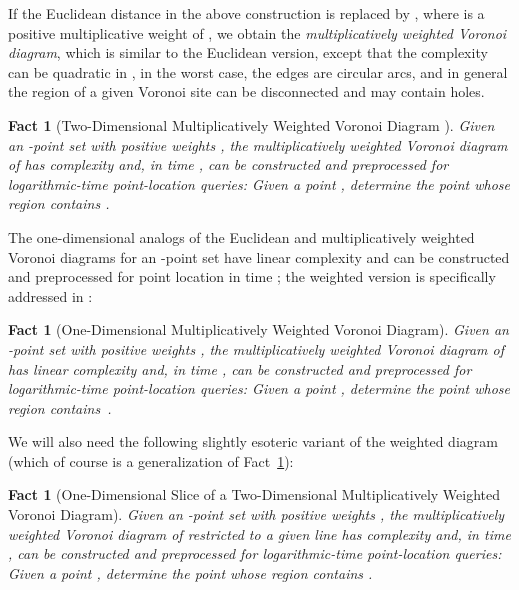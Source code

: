 \documentclass[11pt]{article}
\newtheorem{fact}[theorem]{Fact}
\theoremstyle{remark}
\begin{document}
If the Euclidean distance  in the above construction is replaced
by , where  is a positive multiplicative
weight of , we obtain the \emph{multiplicatively weighted Voronoi diagram},
which is similar to the Euclidean version, except that the complexity
can be quadratic in , in the worst case, the edges are circular
arcs, and in general the region of a given Voronoi site can be
disconnected and may contain holes.



\begin{fact}[Two-Dimensional Multiplicatively Weighted Voronoi Diagram \cite{ae-oacwvdp-84}]
  \label{fact:vor-2d-wtd}
  Given an -point set  with positive weights
  , the multiplicatively weighted Voronoi diagram of  has
  complexity  and, in time ,  can be constructed and
  preprocessed for logarithmic-time \emph{point-location queries}:
  Given a point , determine the point  whose region 
  contains .
\end{fact}

The one-dimensional analogs of the Euclidean and multiplicatively
weighted Voronoi diagrams for an -point set have linear complexity
and can be constructed and preprocessed for point location in time
; the weighted version is specifically addressed
in \cite{a-odwvd-86}:

\begin{fact}[One-Dimensional Multiplicatively Weighted Voronoi Diagram]
  \label{fact:vor-1d-wtd}
  Given an -point set  with positive weights
  , the multiplicatively weighted Voronoi diagram of  has
  linear complexity and, in time , can be constructed and
  preprocessed for logarithmic-time \emph{point-location queries}:
  Given a point , determine the point  whose region 
  contains~.
\end{fact}

We will also need the following slightly esoteric variant of the weighted diagram (which of course is a generalization of Fact~\ref{fact:vor-1d-wtd}): 

\begin{fact}[One-Dimensional Slice of a Two-Dimensional Multiplicatively Weighted Voronoi Diagram]
  \label{fact:vor-2d-slice}
  Given an -point set  with positive weights ,
  the multiplicatively weighted Voronoi diagram of  restricted to a
  given line  has complexity  and, in time
  , can be constructed and preprocessed for logarithmic-time
  \emph{point-location queries}: Given a point , determine the
  point  whose region  contains .
\end{fact}
\end{document}
